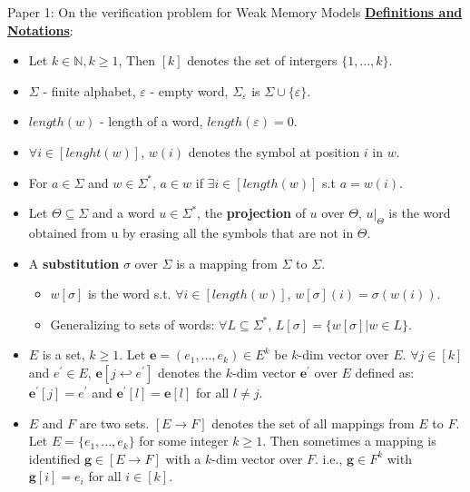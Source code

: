 \documentclass[9pt]{beamer}
\begin{document}
\begin{frame}{Paper 1: On the verification problem for Weak Memory Models}
\underline{\textbf{Definitions and Notations}}:\\

\begin{itemize}
\item Let $k \in \mathbb{N}, k \ge 1$, Then $[k]$ denotes the set of intergers
$\{1,...,k\}$.
\item $\Sigma$ - finite alphabet, $\varepsilon$ - empty word, $\Sigma_\varepsilon$ is $\Sigma \cup \{\varepsilon\}$.
\item $length(w)$ - length of a word, $length(\varepsilon) = 0$.
\item $\forall i \in [lenght(w)]$, $w(i)$ denotes the symbol at position $i$ in $w$.
\item For $a \in \Sigma$ and $w \in \Sigma^{*}$, $a \in w$ if $\exists i \in [length(w)]$ s.t $a=w(i)$.
\pause
\item Let $\Theta \subseteq \Sigma$ and a word $u \in \Sigma^{*}$, the \textbf{projection} of $u$ over $\Theta$, $u|_\Theta$
      is the word obtained from u by erasing all the symbols that are not in $\Theta$.
\pause
\item A \textbf{substitution} $\sigma$ over $\Sigma$ is a mapping from $\Sigma$ to $\Sigma$.
	\begin{itemize}
	\item $w[\sigma]$ is the word s.t. $\forall i \in [length(w)]$, $w[\sigma](i) = \sigma(w(i))$.
  \item Generalizing to sets of words: $\forall L \subseteq \Sigma^*$, $L[\sigma] = \{w[\sigma] | w \in L\}$.
  \end{itemize}
\pause
\item $E$ is a set, $k \ge 1$. Let $\mathbf{e} = (e_1,...,e_k) \in E^k$ be $k$-dim vector over $E$.
      $\forall j \in [k]$ and $e^{\prime} \in E$, $\mathbf{e}[j \hookleftarrow e^{\prime}]$ denotes the $k$-dim vector
      $\mathbf{e}^{\prime}$ over $E$ defined as: $\mathbf{e^{\prime}}[j] = e^{\prime}$ and $\mathbf{e^{\prime}}[l] = \mathbf{e}[l]$ 
      for all $l \neq j$.
\pause 
\item $E$ and $F$ are two sets. $[E \rightarrow F]$ denotes the set of all mappings from $E$ to $F$. 
       Let $E = \{e_1,...,e_k\}$ for some integer $k \ge 1$. Then sometimes a mapping is identified
       $\mathbf{g} \in [E \rightarrow F]$ with a $k$-dim vector over $F$.
       i.e., $\mathbf{g} \in F^k$ with $\mathbf{g}[i] = e_i$ for all $i \in [k]$.
\end{itemize}
\end{frame}
\end{document}
